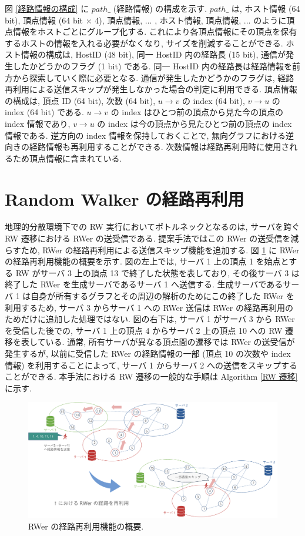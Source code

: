 図 \ref{経路情報の構成} に $path\_$ (経路情報) の構成を示す. $path\_$ は, ホスト情報 (64 bit), 頂点情報 (64 bit $\times$ 4), 頂点情報, ... , ホスト情報, 頂点情報, ... のように頂点情報をホストごとにグループ化する. これにより各頂点情報にその頂点を保有するホストの情報を入れる必要がなくなり, サイズを削減することができる. ホスト情報の構成は, HostID (48 bit), 同一 HostID 内の経路長 (15 bit), 通信が発生したかどうかのフラグ (1 bit) である. 同一 HostID 内の経路長は経路情報を前方から探索していく際に必要となる. 通信が発生したかどうかのフラグは, 経路再利用による送信スキップが発生しなかった場合の判定に利用できる. 頂点情報の構成は, 頂点 ID (64 bit), 次数 (64 bit), $u \rightarrow v$ の index (64 bit), $v \rightarrow u$ の index (64 bit) である. $u \rightarrow v$ の index はひとつ前の頂点から見た今の頂点の index 情報であり, $v \rightarrow u$ の index は今の頂点から見たひとつ前の頂点の index 情報である. 逆方向の index 情報を保持しておくことで, 無向グラフにおける逆向きの経路情報も再利用することができる. 次数情報は経路再利用時に使用されるため頂点情報に含まれている.

\section{Random Walker の経路再利用}\label{Random Walker の経路再利用}

地理的分散環境下での RW 実行においてボトルネックとなるのは, サーバを跨ぐ RW 遷移における RWer の送受信である. 提案手法ではこの RWer の送受信を減らすため, RWer の経路再利用による送信スキップ機能を追加する. 図 \ref{RWer の経路再利用機能の概要} に RWer の経路再利用機能の概要を示す. 図の左上では, サーバ 1 上の頂点 1 を始点とする RW がサーバ 3 上の頂点 13 で終了した状態を表しており, その後サーバ 3 は終了した RWer を生成サーバであるサーバ 1 へ送信する. 生成サーバであるサーバ 1 は自身が所有するグラフとその周辺の解析のためにこの終了した RWer を利用するため, サーバ 3 からサーバ 1 への RWer 送信は RWer の経路再利用のためだけに追加した処理ではない. 図の右下は, サーバ 1 がサーバ 3 から RWer を受信した後での, サーバ 1 上の頂点 4 からサーバ 2 上の頂点 10 への RW 遷移を表している. 通常, 所有サーバが異なる頂点間の遷移では RWer の送受信が発生するが, 以前に受信した RWer の経路情報の一部 (頂点 10 の次数や index 情報) を利用することによって, サーバ 1 からサーバ 2 への送信をスキップすることができる. 本手法における RW 遷移の一般的な手順は Algorithm \ref{RW 遷移} に示す.

\begin{figure}[t]
    \centering
    \includegraphics[scale=0.5]{figure/cache_gai.pdf}
    \caption{RWer の経路再利用機能の概要.}
    \label{RWer の経路再利用機能の概要}
\end{figure}

